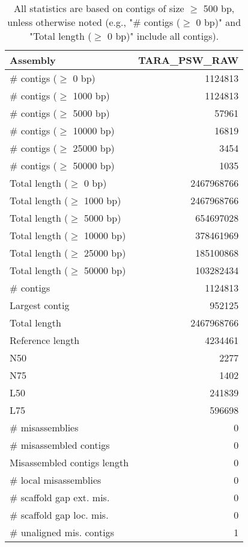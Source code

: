 \documentclass[12pt,a4paper]{article}
\begin{document}
\begin{table}[ht]
\begin{center}
\caption{All statistics are based on contigs of size $\geq$ 500 bp, unless otherwise noted (e.g., "\# contigs ($\geq$ 0 bp)" and "Total length ($\geq$ 0 bp)" include all contigs).}
\begin{tabular}{|l*{1}{|r}|}
\hline
Assembly & TARA\_PSW\_RAW \\ \hline
\# contigs ($\geq$ 0 bp) & 1124813 \\ \hline
\# contigs ($\geq$ 1000 bp) & 1124813 \\ \hline
\# contigs ($\geq$ 5000 bp) & 57961 \\ \hline
\# contigs ($\geq$ 10000 bp) & 16819 \\ \hline
\# contigs ($\geq$ 25000 bp) & 3454 \\ \hline
\# contigs ($\geq$ 50000 bp) & 1035 \\ \hline
Total length ($\geq$ 0 bp) & 2467968766 \\ \hline
Total length ($\geq$ 1000 bp) & 2467968766 \\ \hline
Total length ($\geq$ 5000 bp) & 654697028 \\ \hline
Total length ($\geq$ 10000 bp) & 378461969 \\ \hline
Total length ($\geq$ 25000 bp) & 185100868 \\ \hline
Total length ($\geq$ 50000 bp) & 103282434 \\ \hline
\# contigs & 1124813 \\ \hline
Largest contig & 952125 \\ \hline
Total length & 2467968766 \\ \hline
Reference length & 4234461 \\ \hline
N50 & 2277 \\ \hline
N75 & 1402 \\ \hline
L50 & 241839 \\ \hline
L75 & 596698 \\ \hline
\# misassemblies & 0 \\ \hline
\# misassembled contigs & 0 \\ \hline
Misassembled contigs length & 0 \\ \hline
\# local misassemblies & 0 \\ \hline
\# scaffold gap ext. mis. & 0 \\ \hline
\# scaffold gap loc. mis. & 0 \\ \hline
\# unaligned mis. contigs & 1 \\ \hline

\end{tabular}
\end{center}
\end{table}
\end{document}

